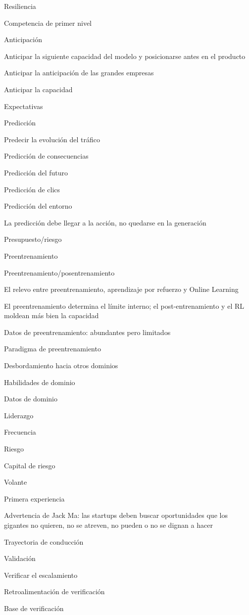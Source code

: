 \documentclass{article}
\begin{document}
Resiliencia

Competencia de primer nivel

Anticipación

Anticipar la siguiente capacidad del modelo y posicionarse antes en el producto

Anticipar la anticipación de las grandes empresas

Anticipar la capacidad

Expectativas

Predicción

Predecir la evolución del tráfico

Predicción de consecuencias

Predicción del futuro

Predicción de clics

Predicción del entorno

La predicción debe llegar a la acción, no quedarse en la generación

Presupuesto/riesgo

Preentrenamiento

Preentrenamiento/posentrenamiento

El relevo entre preentrenamiento, aprendizaje por refuerzo y Online Learning

El preentrenamiento determina el límite interno; el post-entrenamiento y el RL moldean más bien la capacidad

Datos de preentrenamiento: abundantes pero limitados

Paradigma de preentrenamiento

Desbordamiento hacia otros dominios

Habilidades de dominio

Datos de dominio

Liderazgo

Frecuencia

Riesgo

Capital de riesgo

Volante

Primera experiencia

Advertencia de Jack Ma: las startups deben buscar oportunidades que los gigantes no quieren, no se atreven, no pueden o no se dignan a hacer

Trayectoria de conducción

Validación

Verificar el escalamiento

Retroalimentación de verificación

Base de verificación
\end{document}
